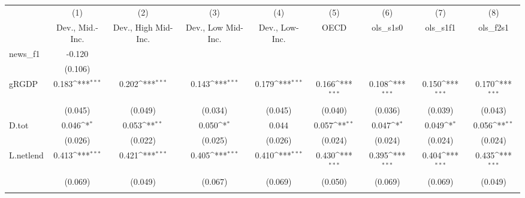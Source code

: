 {
\def\sym#1{\ifmmode^{#1}\else\(^{#1}\)\fi}
\begin{tabular}{l*{8}{c}}
\toprule
            &\multicolumn{1}{c}{(1)}&\multicolumn{1}{c}{(2)}&\multicolumn{1}{c}{(3)}&\multicolumn{1}{c}{(4)}&\multicolumn{1}{c}{(5)}&\multicolumn{1}{c}{(6)}&\multicolumn{1}{c}{(7)}&\multicolumn{1}{c}{(8)}\\
            &\multicolumn{1}{c}{Dev., Mid.-Inc.}&\multicolumn{1}{c}{Dev., High Mid-Inc.}&\multicolumn{1}{c}{Dev., Low Mid-Inc.}&\multicolumn{1}{c}{Dev., Low-Inc.}&\multicolumn{1}{c}{OECD}&\multicolumn{1}{c}{ols\_s1s0}&\multicolumn{1}{c}{ols\_s1f1}&\multicolumn{1}{c}{ols\_f2s1}\\
\midrule
news\_f1     &      -0.120         &                     &                     &                     &                     &                     &                     &                     \\
            &     (0.106)         &                     &                     &                     &                     &                     &                     &                     \\
\addlinespace
gRGDP       &       0.183\sym{***}&       0.202\sym{***}&       0.143\sym{***}&       0.179\sym{***}&       0.166\sym{***}&       0.108\sym{***}&       0.150\sym{***}&       0.170\sym{***}\\
            &     (0.045)         &     (0.049)         &     (0.034)         &     (0.045)         &     (0.040)         &     (0.036)         &     (0.039)         &     (0.043)         \\
\addlinespace
D.tot       &       0.046\sym{*}  &       0.053\sym{**} &       0.050\sym{*}  &       0.044         &       0.057\sym{**} &       0.047\sym{*}  &       0.049\sym{*}  &       0.056\sym{**} \\
            &     (0.026)         &     (0.022)         &     (0.025)         &     (0.026)         &     (0.024)         &     (0.024)         &     (0.024)         &     (0.024)         \\
\addlinespace
L.netlend   &       0.413\sym{***}&       0.421\sym{***}&       0.405\sym{***}&       0.410\sym{***}&       0.430\sym{***}&       0.395\sym{***}&       0.404\sym{***}&       0.435\sym{***}\\
            &     (0.069)         &     (0.049)         &     (0.067)         &     (0.069)         &     (0.050)         &     (0.069)         &     (0.069)         &     (0.049)         \\
\addlinespace

\end{tabular}}
